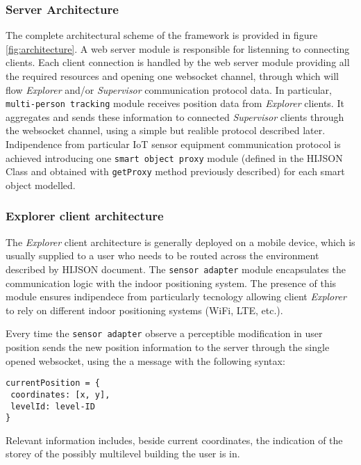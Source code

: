 \subsubsection{Server Architecture}\label{server-architecture}

The complete architectural scheme of the framework is provided in figure
\ref{fig:architecture}. A web server module is responsible for listenning to
connecting clients. Each client connection is handled by the web server module
providing all the required resources and opening one websocket channel,
through which will flow \emph{Explorer} and/or \emph{Supervisor} communication
protocol data. In particular, {\tt multi-person\ tracking} module receives
position data from \emph{Explorer} clients. It aggregates and sends these
information to connected \emph{Supervisor} clients through the websocket
channel, using a simple but realible protocol described later. Indipendence
from particular IoT sensor equipment communication protocol is achieved
introducing one {\tt smart\ object\ proxy} module (defined in the HIJSON Class
and obtained with {\tt getProxy} method previously described) for each smart
object modelled.

\subsubsection{Explorer client architecture}\label{explorer-client-architecture}

The \emph{Explorer} client architecture is generally deployed on a mobile
device, which is usually supplied to a user who needs to be routed across the
environment described by HIJSON document. The {\tt sensor\ adapter} module
encapsulates the communication logic with the indoor positioning system. The
presence of this module ensures indipendece from particularly tecnology
allowing client \emph{Explorer} to rely on different indoor positioning
systems (WiFi, LTE, etc.).

Every time the {\tt sensor\ adapter} observe a perceptible
modification in user position sends the new position information to the
server through the single opened websocket, using the a message with the
following syntax:

\begin{verbatim}
currentPosition = {
 coordinates: [x, y],
 levelId: level-ID 
}
\end{verbatim}

Relevant information includes, beside current coordinates, the indication of
the storey of the possibly multilevel building the user is in.

